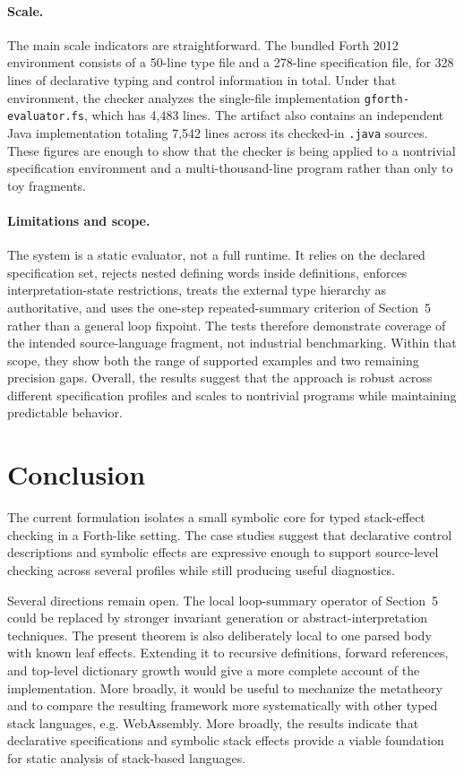 \documentclass[acmsmall,screen,review,anonymous,nonacm]{acmart}
\begin{document}
\paragraph{Scale.}
The main scale indicators are straightforward. The bundled
Forth 2012 environment consists of a 50-line type file and a 278-line specification file,
for 328 lines of declarative typing and control information in total. Under that
environment, the checker analyzes the single-file implementation
\texttt{gforth-evaluator.fs}, which has 4{,}483 lines. The artifact also contains an
independent Java implementation totaling 7{,}542 lines across its checked-in
\texttt{.java} sources. These figures are enough to show that the checker is being applied
to a nontrivial specification environment and a multi-thousand-line program rather than
only to toy fragments.

\paragraph{Limitations and scope.}
The system is a static evaluator, not a full runtime. It relies on the declared
specification set, rejects nested defining words inside definitions, enforces
interpretation-state restrictions, treats the external type hierarchy as authoritative,
and uses the one-step repeated-summary criterion of Section~5 rather than a general loop
fixpoint. The tests therefore demonstrate coverage of the intended source-language
fragment, not industrial benchmarking. Within that scope, they show both the range of
supported examples and two remaining precision gaps.
Overall, the results suggest that the approach is robust across different specification
profiles and scales to nontrivial programs while maintaining predictable behavior.

\section{Conclusion}
The current formulation isolates a small symbolic core for typed stack-effect
checking in a Forth-like setting. The case studies suggest that declarative
control descriptions and symbolic effects are expressive enough to support
source-level checking across several profiles while still producing useful
diagnostics.

Several directions remain open. The local loop-summary operator of
Section~5 could be replaced by stronger invariant generation or abstract-interpretation
techniques. The present theorem is also deliberately local to one parsed body with
known leaf effects. Extending it to recursive definitions, forward references, and
top-level dictionary growth would give a more complete account of the implementation.
More broadly, it would be useful to mechanize the metatheory and to compare the
resulting framework more systematically with other typed stack languages, e.g.
WebAssembly.
More broadly, the results indicate that declarative specifications and symbolic stack
effects provide a viable foundation for static analysis of stack-based
languages.



\end{document}
